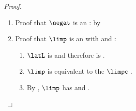 \begin{proof}
\begin{enumerate}
  \item Proof that $\negat$ is an : by 
  \item Proof that $\limp$ is an  with  and :
    \begin{enumerate}
        \item $\latL$ is  and therefore is .
        \item $\limp$ is equivalent to the  $\limpc$ .
        \item By , $\limp$ has  and .
    \end{enumerate}
\end{enumerate}
\end{proof}

